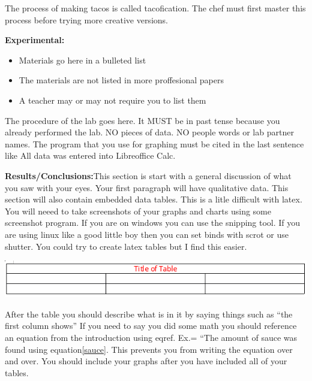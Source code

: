 \documentclass{report}
\begin{document}
The process of making tacos is called tacofication\supercite{taco}. The chef must first master this process before trying more creative versions. 
\begin{flushleft}
\textbf{Experimental:}
\end{flushleft}
\begin{itemize}
\item{Materials go here in a bulleted list}
\item{The materials are not listed in more proffesional papers}
\item{A teacher may or may not require you to list them}
\end{itemize}
The procedure of the lab goes here. It MUST be in past tense because you already performed the lab. NO pieces of data. NO people words or lab partner names. The program that you use for graphing must be cited in the last sentence like All data was entered into Libreoffice Calc\supercite{libreoffice}.
\begin{flushleft}
\textbf{Results/Conclusions:}This section is start with a general discussion of what you saw with your eyes. Your first paragraph will have qualitative data. This section will also contain embedded data tables. This is a litle difficult with latex. You will neeed to take screenshots of your graphs and charts using some screenshot program. If you are on windows you can use the snipping tool. If you are using linux like a good little boy then you can set binds with scrot or use shutter. You could try to create latex tables but I find this easier.
\end{flushleft}
\begin{center}
\includegraphics[scale=.7]{examplechart}
\end{center}
\begin{flushleft} 
After the table you should describe what is in it by saying things such as ``the first column shows'' If you need to say you did some math you should reference an equation from the introduction using eqref. Ex.= ``The amount of sauce was found using equation\eqref{sauce}. This prevents you from writing the equation over and over. You should include your graphs after you have included all of your tables. 
\end{flushleft}
\end{document}
